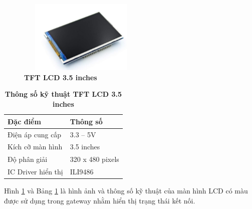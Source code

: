 \documentclass{article} %
\begin{document}
\begin{itemize}
\begin{itemize}[label=$\ast$]
\begin{itemize}
				\begin{figure}[!ht]
					\centering
					\includegraphics[width=6cm,height=3.5cm]{Images/LCD3.5.png}
					\caption[TFT LCD  3.5 inches\cite{TFT3.5}]{\bfseries \fontsize{12pt}{0pt}\selectfont TFT LCD  3.5 inches\cite{TFT3.5}}
					\label{LCD3.5}
				\end{figure}
				\begin{table}[H]
					\centering
					\begin{tabular}{|l|l|}
						\hline
						Đặc điểm           & Thông số         \\ \hline
						Điện áp cung cấp   & 3.3 – 5V         \\ \hline
						Kích cỡ màn hình   & 3.5 inches       \\ \hline
						Độ phân giải       & 320 x 480 pixels \\ \hline
						IC Driver hiển thị & ILI9486          \\ \hline
					\end{tabular}
					\caption[Thông số kỹ thuật TFT LCD 3.5 inches\cite{TFT3.5}]{\bfseries\fontsize{12pt}{0pt}\selectfont Thông số kỹ thuật TFT LCD 3.5 inches\cite{TFT3.5}}
					\label{ThongsoLCD3.5}
				\end{table}
				Hình \ref{LCD3.5} và Bảng \ref{ThongsoLCD3.5} là hình ảnh và thông số kỹ thuật của màn hình LCD có màu được sử dụng trong gateway nhằm hiển thị trạng thái kết nối.
			\end{itemize}
			

\end{itemize}
\end{itemize}
\end{document}
